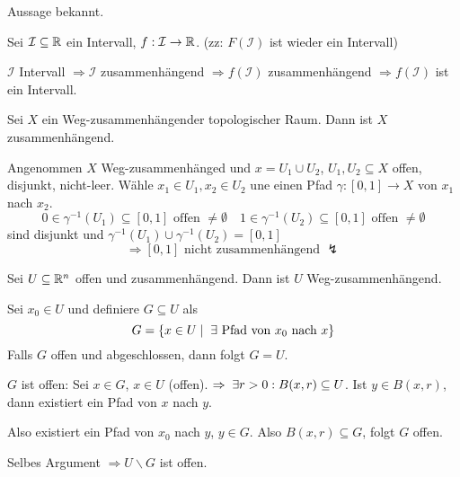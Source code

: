 \documentclass[main.tex]{subfiles}
\begin{document}
\begin{Korollar}[Zwischenwertsatz]
  Aussage bekannt.
\end{Korollar}

\begin{Beweis}
  Sei $\mathcal{I} \subseteq \mathbb{R}$ ein Intervall, $f: \mathcal{I} \to \mathbb{R}$. (zz: $F(\mathcal{I})$ ist wieder ein Intervall)

  $\mathcal{I}$ Intervall $\Rightarrow \mathcal{I}$ zusammenhängend $\Rightarrow f(\mathcal{I})$ zusammenhängend $\Rightarrow f(\mathcal{I})$ ist ein Intervall.
\end{Beweis}

\begin{Theorem}
  Sei $X$ ein Weg-zusammenhängender topologischer Raum. Dann ist $X$ zusammenhängend.
\end{Theorem}

\begin{Beweis}
  Angenommen $X$ Weg-zusammenhänged und $x = U_1 \cup U_2$, $U_1, U_2 \subseteq X$ offen, disjunkt, nicht-leer. Wähle $x_1 \in U_1, x_2 \in U_2$ une einen Pfad $\gamma: [0,1] \to X$ von $x_1$ nach $x_2$.
  $$0 \in \gamma^{-1}(U_1) \subseteq [0,1] \text{ offen } \neq \emptyset \quad 1 \in \gamma^{-1}(U_2) \subseteq [0,1] \text{ offen } \neq \emptyset$$
  sind disjunkt und $\gamma^{-1}(U_1) \cup \gamma^{-1}(U_2) = [0,1]$
  $$\Rightarrow [0,1] \text{ nicht zusammenhängend } \lightning$$
\end{Beweis}

\begin{Theorem}
  Sei $U \subseteq \mathbb{R}^n$ offen und zusammenhängend. Dann ist $U$ Weg-zusammenhängend.
\end{Theorem}

\begin{Beweis}
  Sei $x_0 \in U$ und definiere $G \subseteq U$ als
  $$G = \{x \in U \mid \;\exists \text{ Pfad von $x_0$ nach }x \}$$
  Falls $G$ offen und abgeschlossen, dann folgt $G = U$.

  $G$ ist offen: Sei $x \in G$, $x \in U$ (offen). $\Rightarrow \;\exists r > 0 : B(x, r) \subseteq U$. Ist $y \in B(x,r)$, dann existiert ein Pfad von $x$ nach $y$.

  Also existiert ein Pfad von $x_0$ nach $y$, $y \in G$. Also $B(x,r) \subseteq G$, folgt $G$ offen.

  Selbes Argument $\Rightarrow U \backslash G$ ist offen.
\end{Beweis}
\end{document}
